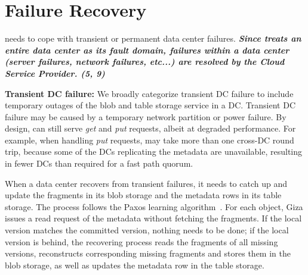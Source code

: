 \section{Failure Recovery}


\name needs to cope with transient or permanent data center failures. \textit{\textbf{Since \name treats an entire data center as its fault domain, failures within a data center (server failures, network failures, etc...) are resolved by the Cloud Service Provider. (5, 9)}}

{\bf Transient DC failure:}
We broadly categorize transient DC failure to include temporary outages of the blob
and table storage service in a DC. 
Transient DC failure may be caused by a temporary network partition or power failure.
By design, {\name} can still serve {\em get} and {\em put} requests, albeit at degraded performance. 
For example, when handling {\em put} requests,
\name may take more than one cross-DC round trip,
because some of the DCs replicating the metadata are unavailable,
resulting in fewer DCs than required for a fast path quorum.

When a data center recovers from transient failures,
it needs to catch up and update the fragments in its blob storage
and the metadata rows in its table storage. 
The process follows the Paxos learning algorithm~\cite{lamport01paxos}.
For each object, Giza issues a read request of the metadata without fetching the fragments.
If the local version matches the committed version, nothing needs to be done;
if the local version is behind,
the recovering process reads the fragments of all missing versions,
reconstructs corresponding missing fragments and stores them in the blob storage,
as well as updates the metadata row in the table storage.

